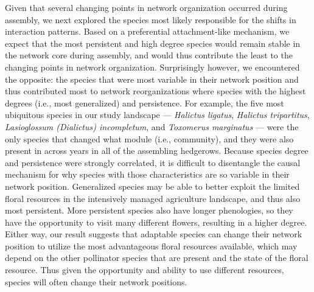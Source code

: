 \documentclass[12pt]{article}
\begin{document}
Given that several changing points in network organization occurred
during assembly, we next explored the species most likely responsible
for the shifts in interaction patterns. Based on a preferential
attachment-like mechanism, we expect that the most persistent and high
degree species would remain stable in the network core during
assembly, and would thus contribute the least to the changing points
in network organization. Surprisingly however, we encountered the
opposite: the species that were most variable in their network
position and thus contributed most to network reorganizations where
species with the highest degrees (i.e., most generalized) and
persistence. For example, the five most ubiquitous species in our
study landscape --- \textit{Halictus ligatus}, \textit{Halictus
  tripartitus}, \textit{Lasioglossum (Dialictus) incompletum}, and
\textit{Toxomerus marginatus} --- were the only species that changed
what module (i.e., community), and they were also present in across
years in all of the assembling hedgerows. Because species degree and
persistence were strongly correlated, it is difficult to disentangle
the causal mechanism for why species with those characteristics are so
variable in their network position. Generalized species may be able to
better exploit the limited floral resources in the intensively managed
agriculture landscape, and thus also most persistent. More persistent
species also have longer phenologies, so they have the opportunity to
visit many different flowers, resulting in a higher degree. Either
way, our result suggests that adaptable species can change their
network position to utilize the most advantageous floral resources
available, which may depend on the other pollinator species that are
present and the state of the floral resource. Thus given the
opportunity and ability to use different resources, species will often
change their network positions.

\end{document}
